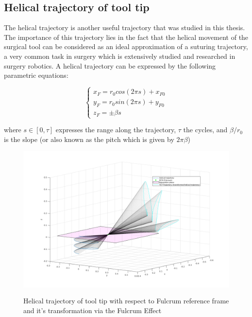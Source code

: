 \subsection{Helical trajectory of tool tip}

The helical trajectory is another useful trajectory that was studied in this thesis. The importance of this trajectory lies in the fact that the helical movement of the surgical tool can be considered as an ideal 
approximation of a suturing trajectory, a very common task in surgery which is extensively studied and researched in surgery robotics. A helical trajectory can be expressed by the following parametric equations:

\begin{equation}
\begin{cases}
x^{}_{F} = r_0cos(2πs) + x^{}_{F0} \\
y^{}_{F} = r_0sin(2πs) + y^{}_{F0} \\
z^{}_{F} = \pm βs
\end{cases}
\end{equation}

where $s \in \left[ 0, τ \right]$ expresses the range along the trajectory, $τ$ the cycles, and $β/r_0$ is the slope (or also known as the pitch which is given by $2πβ$)

\begin{center}
\begin{figure}[!htb]
\centering
\includegraphics[width=\textwidth]{images/rcm_trajectories/rcm_helical_traj.png}\\
\caption{Helical trajectory of tool tip with respect to Fulcrum reference frame and it's transformation via the Fulcrum Effect}
\end{figure}
\end{center}

